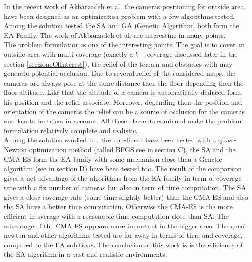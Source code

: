 In the recent work of Akbarzadeh et al. \cite{141*akbarzadeh2013} the cameras positioning for outside area, have been designed as an optimization problem with a few algorithms tested. Among the solution tested the SA and GA (Genetic Algorithm) both form the EA Family. 
The work of Akbarzadeh et al. \cite{141*akbarzadeh2013} are interesting in many points. \\
The problem formulation is one of the interesting points. The goal is to cover an outside area with  multi coverage (exactly a $k-$coverage  discussed later in the  section \ref{sec:zoneOfInterest}), the relief of the terrain and obstacles with may generate potential occlusion. 
Due to several relief of the considered maps, the cameras  are always pose at the same distance then the floor  depending then the floor altitude. Like that the altitude of a camera is automatically deduced form his position and the relief associate. Moreover, depending then the position and orientation of the cameras the relief can be a source of occlusion for the cameras and has to be taken in account.
All these elements combined make the problem formulation relatively complete and realistic.\\
 Among the solution studied in \cite{141*akbarzadeh2013}, the non-linear have been tested with a quasi-Newton optimization method (called BFGS see in \cite{141*akbarzadeh2013} section C), the SA and the CMA-ES  form the EA family with some mechanism close then a Genetic algorithm (see in \cite{141*akbarzadeh2013} section D) have been tested too.
The result of the comparison gives a net advantage of the algorithms from the EA family in term of coverage rate with a fix number of cameras but also in term of time computation. 
 The SA gives a close coverage rate (some time slightly better) than the CMA-ES and also the SA have a better time computation. Otherwise the CMA-ES is the more efficient in average with a reasonable time computation close than SA. The advantage of the CMA-ES appears more important in the bigger area. The quasi-newton and other algorithms tested are far away in terms of time and coverage, compared to the EA solutions.  The conclusion of this work \cite{141*akbarzadeh2013} is  is the efficiency of the EA algorithm in a vast and realistic environments.
 
